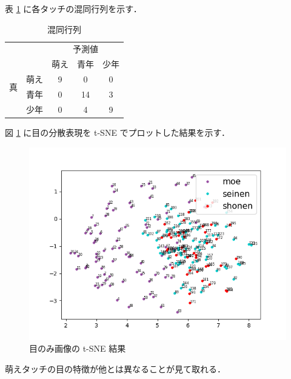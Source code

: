 \documentclass[onecolumn]{ujarticle}     %
\begin{document}
	表 \ref{tab:etc} に各タッチの混同行列を示す．
	\begin{table}[h]
		\begin{center}
			\caption{混同行列}
			\label{tab:etc}
			\vspace{-4mm}
			\begin{tabular}{|c|c||c|c|c|}\hline
				\multicolumn{2}{|c||}{}&\multicolumn{3}{|c|}{予測値} \\ \cline{3-5}
				\multicolumn{2}{|c||}{}&萌え&青年&少年 \\ \hline \hline
				\multirow{2}{*}{真}&萌え&9&0&0\\ \cline{2-5}
				\multirow{2}{*}{値}&青年&0&14&3\\ \cline{2-5}
				&少年&0&4&9\\ \hline
			\end{tabular}
		\end{center}
	\end{table}
	
	図 \ref{fig:tsne} に目の分散表現を t-SNE でプロットした結果を示す．
	\begin{figure}[h]
		\begin{center}
			\includegraphics[width=0.8\columnwidth]{t_sne_CAE_hwf_80_weight_all.png}
			\caption{目のみ画像の t-SNE 結果}
			\label{fig:tsne}
		\end{center}
	\end{figure}
	萌えタッチの目の特徴が他とは異なることが見て取れる．
	
\end{document}
